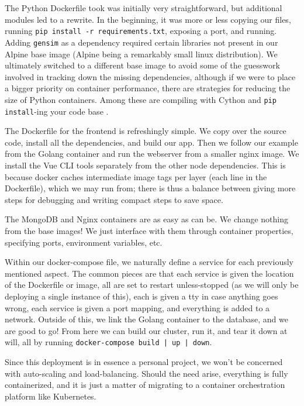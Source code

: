 \documentclass[11pt, twoside, reqno]{book}
\begin{document}
\label{Python Model API Dockerfile}

The Python Dockerfile took was initially very straightforward, but additional modules led to a rewrite. In the beginning, it was more or less copying our files, running \texttt{pip install -r requirements.txt}, exposing a port, and running. Adding \texttt{gensim} as a dependency required certain libraries not present in our Alpine base image (Alpine being a remarkably small linux distribution). We ultimately switched to a different base image to avoid some of the guesswork involved in tracking down the missing dependencies, although if we were to place a bigger priority on container performance, there are strategies for reducing the size of Python containers. Among these are compiling with Cython and \texttt{pip install}-ing your code base \cite{Multista76:online}.

\label{Vue Frontend Dockerfile}

The Dockerfile for the frontend is refreshingly simple. We copy over the source code, install all the dependencies, and build our app. Then we follow our example from the Golang container and run the webserver from a smaller nginx image. We install the Vue CLI tools separately from the other node dependencies. This is because docker caches intermediate image tags per layer (each line in the Dockerfile), which we may run from; there is thus a balance between giving more steps for debugging and writing compact steps to save space.

\label{Mongo and Nginx}

The MongoDB and Nginx containers are as easy as can be. We change nothing from the base images! We just interface with them through container properties, specifying ports, environment variables, etc.

\label{Composition}

Within our docker-compose file, we naturally define a service for each previously mentioned aspect. The common pieces are that each service is given the location of the Dockerfile or image, all are set to restart unless-stopped (as we will only be deploying a single instance of this), each is given a tty in case anything goes wrong, each service is given a port mapping, and everything is added to a network. Outside of this, we link the Golang container to the database, and we are good to go! From here we can build our cluster, run it, and tear it down at will, all by running \texttt{docker-compose build | up | down}.

Since this deployment is in essence a personal project, we won't be concerned with auto-scaling and load-balancing. Should the need arise, everything is fully containerized, and it is just a matter of migrating to a container orchestration platform like Kubernetes.
\end{document}
